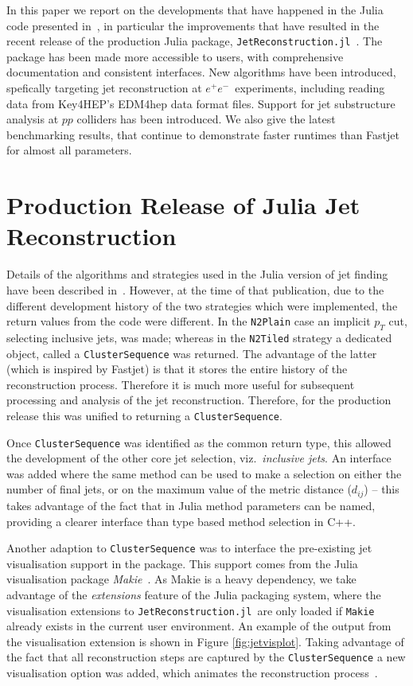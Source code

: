 \documentclass{webofc}
\newcommand{\JR}{\texttt{JetReconstruction.jl}}
\newcommand{\ee}{$e^+e^-$}
\begin{document}
In this paper we report on the developments that have happened in the Julia code
presented in~\cite{polyglot-jets-chep23}, in particular the improvements that
have resulted in the recent release of the production Julia package,
\JR~\cite{jetreconstruction-jl-github}. The package has been made more
accessible to users, with comprehensive documentation and consistent interfaces.
New algorithms have been introduced, spefically targeting jet reconstruction at
\ee\ experiments, including reading data from Key4HEP's EDM4hep data format
files. Support for jet substructure analysis at $pp$ colliders has been
introduced. We also give the latest benchmarking results, that continue to
demonstrate faster runtimes than Fastjet~\cite{Cacciari:2011ma} for almost all
parameters.

\section{Production Release of Julia Jet Reconstruction}
\label{sec:prodrel}

Details of the algorithms and strategies used in the Julia version of jet
finding have been described in~\cite{polyglot-jets-chep23}. However, at the time
of that publication, due to the different development history of the two
strategies which were implemented, the return values from the code were
different. In the \texttt{N2Plain} case an implicit $p_T$ cut, selecting
inclusive jets, was made; whereas in the \texttt{N2Tiled} strategy a dedicated
object, called a \texttt{ClusterSequence} was returned. The advantage of the
latter (which is inspired by Fastjet) is that it stores the entire history of
the reconstruction process. Therefore it is much more useful for subsequent
processing and analysis of the jet reconstruction. Therefore, for the production
release this was unified to returning a \texttt{ClusterSequence}.

Once \texttt{ClusterSequence} was identified as the common return type, this
allowed the development of the other core jet selection, viz.\ \emph{inclusive
jets}. An interface was added where the same method can be used to make a
selection on either the number of final jets, or on the maximum value of the
metric distance ($d_{ij}$) -- this takes advantage of the fact that in Julia
method parameters can be named, providing a clearer interface than type based
method selection in C++.

Another adaption to \texttt{ClusterSequence} was to interface the pre-existing
jet visualisation support in the package. This support comes from the Julia
visualisation package \emph{Makie}~\cite{Danisch2021}. As Makie is a heavy
dependency, we take advantage of the \emph{extensions} feature of the Julia
packaging system, where the visualisation extensions to \JR\ are only loaded if
\texttt{Makie} already exists in the current user environment. An example of the
output from the visualisation extension is shown in Figure \ref{fig:jetvisplot}.
Taking advantage of the fact that all reconstruction steps are captured by the
\texttt{ClusterSequence} a new visualisation option was added, which animates
the reconstruction process~\cite{jetrecoAnimationCHEP2024}.
\end{document}
